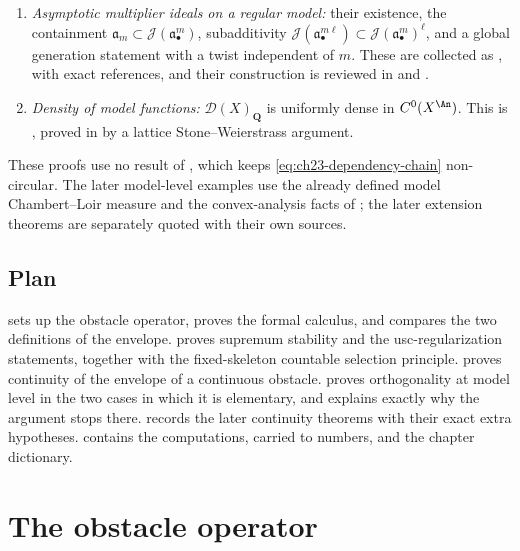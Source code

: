 \begin{enumerate}
\item \emph{Asymptotic multiplier ideals on a regular model:} their
existence, the containment $\mathfrak a_m\subset\mathcal J(\mathfrak
a_\bullet^m)$, subadditivity
$\mathcal J(\mathfrak a_\bullet^{m\ell})\subset\mathcal J(\mathfrak
a_\bullet^m)^\ell$, and a global generation statement with a twist
independent of $m$.  These are collected as
, with exact references, and their
construction is reviewed in  and
.
\item \emph{Density of model functions:} $\mathcal D(X)_{\mathbf Q}$ is
uniformly dense in $C^0(X^{\An})$.  This is
, proved in 
by a lattice Stone--Weierstrass argument.
\end{enumerate}

These proofs use no result of
, which keeps
\eqref{eq:ch23-dependency-chain} non-circular.  The later model-level
examples use the already defined model Chambert--Loir measure and the
convex-analysis facts of ; the later extension theorems
are separately quoted with their own sources.

\subsection{Plan}
\label{sec:ch23-plan}

 sets up the obstacle operator, proves the
formal calculus, and compares the two definitions of the envelope.
 proves supremum stability and the
usc-regularization statements, together with the fixed-skeleton countable
selection principle.   proves continuity of the
envelope of a continuous obstacle.  
proves orthogonality at model level in the two cases in which it is
elementary, and explains exactly why the argument stops there.
 records the later continuity theorems with their exact
extra hypotheses.   contains the computations, carried
to numbers, and  the chapter dictionary.

\section{The obstacle operator}
\label{sec:ch23-obstacle-operator}

